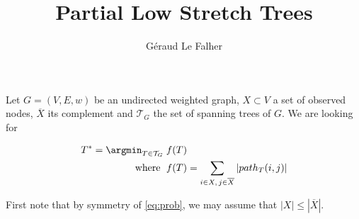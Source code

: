 \documentclass[a4paper,final,notitlepage,11pt,svgnames]{scrartcl}
\title{Partial Low Stretch Trees}
\author{Géraud Le Falher}
\newcommand{\stcomp}[1]{\ensuremath{\overline{#1}}}
\newcommand{\allst}{\ensuremath{\mathcal{T}_G}}
\begin{document}
\maketitle

Let $G=(V,E,w)$ be an undirected weighted graph, $X \subset V$ a set of observed
nodes, $\stcomp{X}$ its complement and \allst{} the set of spanning
trees of $G$. We are looking for

\begin{align}
	T^* = \argmin_{T \in \mathcal{T}_G} \; & f(T) \notag \\
	\text{where }\; & f(T) = \sum_{i \in X ,\,j \in \stcomp{X}} \left| path_T(i, j) \right |
	\label{eq:prob}
\end{align}

First note that by symmetry of \eqref{eq:prob}, we may assume that $|X| \leq
\left| \stcomp{X}\right|$.
\end{document}
